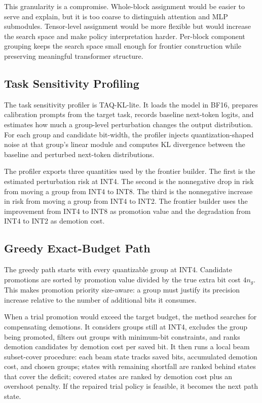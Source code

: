 \documentclass{article}
\newcommand{\inttwo}{INT2}
\newcommand{\intfour}{INT4}
\newcommand{\inteight}{INT8}
\begin{document}
This granularity is a compromise. Whole-block assignment would be easier to serve and explain, but it is too coarse to distinguish attention and MLP submodules. Tensor-level assignment would be more flexible but would increase the search space and make policy interpretation harder. Per-block component grouping keeps the search space small enough for frontier construction while preserving meaningful transformer structure.

\subsection{Task Sensitivity Profiling}

The task sensitivity profiler is TAQ-KL-lite. It loads the model in BF16, prepares calibration prompts from the target task, records baseline next-token logits, and estimates how much a group-level perturbation changes the output distribution. For each group and candidate bit-width, the profiler injects quantization-shaped noise at that group's linear module and computes KL divergence between the baseline and perturbed next-token distributions.

The profiler exports three quantities used by the frontier builder. The first is the estimated perturbation risk at \intfour{}. The second is the nonnegative drop in risk from moving a group from \intfour{} to \inteight{}. The third is the nonnegative increase in risk from moving a group from \intfour{} to \inttwo{}. The frontier builder uses the improvement from \intfour{} to \inteight{} as promotion value and the degradation from \intfour{} to \inttwo{} as demotion cost.

\subsection{Greedy Exact-Budget Path}

The greedy path starts with every quantizable group at \intfour{}. Candidate promotions are sorted by promotion value divided by the true extra bit cost $4n_g$. This makes promotion priority size-aware: a group must justify its precision increase relative to the number of additional bits it consumes.

When a trial promotion would exceed the target budget, the method searches for compensating demotions. It considers groups still at \intfour{}, excludes the group being promoted, filters out groups with minimum-bit constraints, and ranks demotion candidates by demotion cost per saved bit. It then runs a local beam subset-cover procedure: each beam state tracks saved bits, accumulated demotion cost, and chosen groups; states with remaining shortfall are ranked behind states that cover the deficit; covered states are ranked by demotion cost plus an overshoot penalty. If the repaired trial policy is feasible, it becomes the next path state.
\end{document}
